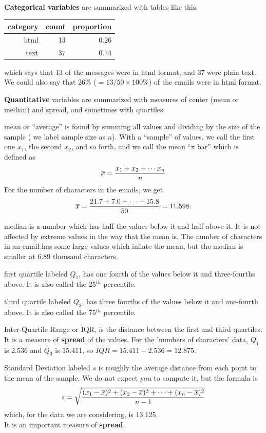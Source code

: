\begin{list}{}{}
\item [\bf Categorical variables] are summarized with tables like
  this:

\begin{tabular}{rrr}
 category & count & proportion\\
  \hline
html &  13 & 0.26\\ 
text &  37 & 0.74\\ 
   \hline
\end{tabular}

 which says that 13 of the messages were in html format, and 37 were
 plain text.  We could also say that 26\% ($= 13 / 50 \times 100\%$)
 of the emails were in html format. 

\item [\bf Quantitative] variables are summarized with measures of
  center (mean or median) and spread, and sometimes with quartiles.
  \begin{list}{}{}
  \item [mean] or ``average'' is found by summing all values and
    dividing by the size of the sample ( we label sample size as $n$).
    With a ``sample'' of values, we call the first one $x_1$, the
    second $x_2$, and so forth, and we call the mean ``x bar'' which
    is defined as
   $$\overline{x} = \frac{x_1 + x_2 + \cdots x_n}{n}$$
  For the number of characters in the emails, we get 
   $$\overline{x} = \frac{21.7 + 7.0 + \cdots + 15.8}{50} = 11.598.$$
  \item [median] is a number which has half the values below it and
    half above it.  It is not affected by extreme values in the way
    that the mean is.  The number of characters in an email has some
    large values which inflate the mean, but the median is smaller at
    6.89 thousand characters.
  \item [first quartile] labeled $Q_1$, has one fourth of the values
    below it and three-fourths above. It is also called the 25$^{th}$
    percentile. 
  \item [third quartile] labeled $Q_3$, has three fourths of the values
    below it and one-fourth above.  It is also called the 75$^{th}$
    percentile. 
  \item [Inter-Quartile Range] or IQR, is the distance between the
    first and third quartiles.  It is a measure of {\bf spread} of the
    values.  For the 'numbers of characters' data, $Q_1$ is 2.536 and $Q_3$ is
    15.411, so $IQR = 15.411 - 2.536 = 12.875$.
  \item [Standard Deviation] labeled $s$ is roughly the average
    distance from each point to the mean of the sample.  We do not
    expect you to compute it, but the formula is
      $$ s = \sqrt{\frac{(x_1-\overline{x})^2 + (x_2-\overline{x})^2 + \cdots+ (x_n-\overline{x})^2}{n-1}}$$
    which, for the data we are considering, is 13.125.\\
    It is an important measure of {\bf spread}.
  \end{list}
\end{list}
\newpage

